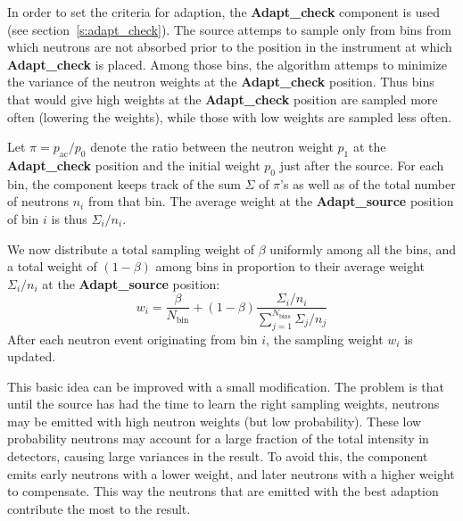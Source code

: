 In order to set the criteria for adaption, the \textbf{Adapt\_check} component is
used (see section~\ref{s:adapt_check}). The source attemps to sample
only from bins from which neutrons are not absorbed prior to the
position in the instrument at which \textbf{Adapt\_check} is
placed. Among those bins, the algorithm attemps to minimize the variance
of the neutron weights at the \textbf{Adapt\_check} position. Thus bins that
would give high weights at the \textbf{Adapt\_check} position are sampled more
often (lowering the weights), while those with low weights are sampled
less often.

Let $\pi = p_\textrm{ac}/p_0$ denote the ratio between the neutron weight $p_1$ at
the \textbf{Adapt\_check} position and the initial weight $p_0$ just after the
source. For each bin, the component keeps track of the sum $\Sigma$ of
$\pi$'s as well as of the total number of neutrons $n_i$ from that
bin. The average weight at the \textbf{Adapt\_source} position of bin $i$ is thus
$\Sigma_i/n_i$.

We now distribute a total sampling weight of $\beta$ uniformly
among all the bins, and a total weight of $(1 - \beta)$ among bins in
proportion to their average weight $\Sigma_i/n_i$ at the \textbf{Adapt\_source}
position:
\begin{equation}
w_i = \frac{\beta}{N_\textrm{bin}} +
    (1-\beta) \frac{\Sigma_i/n_i}{\sum_{j=1}^{N_\textrm{bins}} \Sigma_j/n_j}
\end{equation}
After each neutron event originating from bin $i$, the sampling weight $w_i$
is updated.

This basic idea can be improved with a small modification. The problem
is that until the source has had the time to learn the right sampling
weights, neutrons may be emitted with high neutron weights (but low
probability). These low probability neutrons may account for a large fraction of
the total intensity in detectors, causing large variances in the
result. To avoid this, the component emits early neutrons with a lower
weight, and later neutrons with a higher weight to compensate. This way
the neutrons that are emitted with the best adaption contribute the most
to the result.

